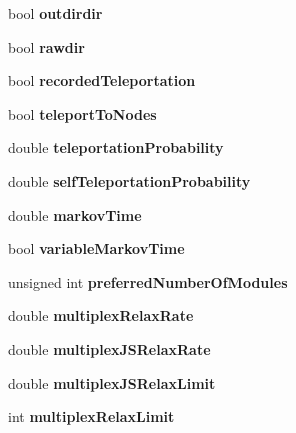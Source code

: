 \begin{DoxyCompactItemize}
bool {\bfseries outdirdir}
\item 
\mbox{\label{structConfig_a8637de95c26789416624d2ab66167a8e}} 
bool {\bfseries rawdir}
\item 
\mbox{\label{structConfig_aca046672c17d48fa0433b3bafccbb240}} 
bool {\bfseries recorded\+Teleportation}
\item 
\mbox{\label{structConfig_a137f421d41d8445fda3bfab41287f9dc}} 
bool {\bfseries teleport\+To\+Nodes}
\item 
\mbox{\label{structConfig_a5a57d549631248cd43ad60f26ac1d8b3}} 
double {\bfseries teleportation\+Probability}
\item 
\mbox{\label{structConfig_afa3c7b2e754933f6a68e6b2a8f11d8aa}} 
double {\bfseries self\+Teleportation\+Probability}
\item 
\mbox{\label{structConfig_a5863b9bda9b030f7dcdb7087469e26b2}} 
double {\bfseries markov\+Time}
\item 
\mbox{\label{structConfig_a60981402e1b8834770060c8ebf4470de}} 
bool {\bfseries variable\+Markov\+Time}
\item 
\mbox{\label{structConfig_a0ba1b02242904b03fce17759678f0f77}} 
unsigned int {\bfseries preferred\+Number\+Of\+Modules}
\item 
\mbox{\label{structConfig_a0480e8b71d653e6c218e5ac8ea21c0dc}} 
double {\bfseries multiplex\+Relax\+Rate}
\item 
\mbox{\label{structConfig_ac7a2e1b9e11a3d33e5ba0d1af4177be1}} 
double {\bfseries multiplex\+J\+S\+Relax\+Rate}
\item 
\mbox{\label{structConfig_a0a85ef6ffba2e4f4e80e5ffc56968ec1}} 
double {\bfseries multiplex\+J\+S\+Relax\+Limit}
\item 
\mbox{\label{structConfig_ab74e5ae66f749b5696077499810bf688}} 
int {\bfseries multiplex\+Relax\+Limit}
\item 

\end{DoxyCompactItemize}
